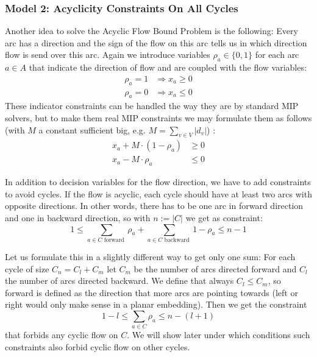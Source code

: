 \subsubsection{Model 2: Acyclicity Constraints On All Cycles}

Another idea to solve the Acyclic Flow Bound Problem 
is the following: Every arc has a direction and the 
sign of the flow on this arc tells us in which direction flow is send over this arc. Again we introduce variables 
$\rho_a\in \{0,1\}$ for each arc $a\in A$ that indicate the direction of flow and are coupled with the flow variables:
\begin{align*}
\rho_a=1 & \Rightarrow x_a\ge 0 \\
\rho_a=0 & \Rightarrow x_a\le 0
\end{align*}
These indicator constraints can be handled the way they are by standard MIP solvers, but to make them real MIP 
constraints we may formulate them as follows (with $M$ a constant sufficient big, e.g. $M=\sum_{v\in V}|d_v|$) :
\begin{align*}
 x_a + M\cdot (1-\rho_a) &\ge 0\\
 x_a - M\cdot \rho_a & \le 0
\end{align*}

In addition to decision variables for the flow direction, we have to add constraints to avoid cycles. If the flow is 
acyclic, each cycle should have at least two arcs with opposite directions. In other words, there has to be one arc
in forward direction and one in backward direction, so with $n:=|C|$ we get as constraint:
$$ 1\le\sum_{a\in C\textrm{ forward }} \rho_a + \sum_{a\in C\textrm{ backward }}1-\rho_a\le n-1$$

Let us formulate this in a slightly different way to get only one sum: For each cycle of size $C_n=C_l+C_m$ 
let $C_m$ be the number of arcs directed forward and $C_l$ the number of arcs directed backward. We define that always 
$C_l\le C_m$, so forward is defined as the direction that more arcs are pointing towards (left or right would only 
make sense in a planar embedding). Then we get the constraint $$1-l \le \sum_{a\in C}\rho_a\le n-(l+1)$$ that forbids 
any cyclic flow on $C$. We will show later under which conditions such constraints also forbid cyclic flow on other 
cycles. 

